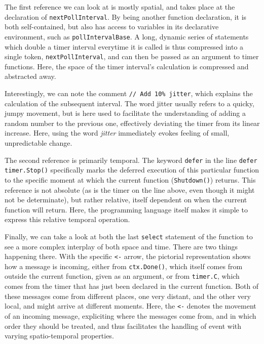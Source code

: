The first reference we can look at is mostly spatial, and takes place at the declaration of \lstinline{nextPollInterval}. By being another function declaration, it is both self-contained, but also has access to variables in its declarative environment, such as \lstinline{pollIntervalBase}. A long, dynamic series of statements which double a timer interval everytime it is called is thus compressed into a single token, \lstinline{nextPollInterval}, and can then be passed as an argument to timer functions. Here, the space of the timer interval's calculation is compressed and abstracted away.

Interestingly, we can note the comment \lstinline{// Add 10% jitter}, which explains the calculation of the subsequent interval. The word jitter usually refers to a quicky, jumpy movement, but is here used to facilitate the understanding of adding a random number to the previous one, effectively deviating the timer from its linear increase. Here, using the word \emph{jitter} immediately evokes feeling of small, unpredictable change.

The second reference is primarily temporal. The keyword \lstinline{defer} in the line \lstinline{defer timer.Stop()} specifically marks the deferred execution of this particular function to the specific moment at which the current function (\lstinline{Shutdown()}) returns. This reference is not absolute (as is the timer on the line above, even though it might not be determinate), but rather relative, itself dependent on when the current function will return. Here, the programming language itself makes it simple to express this relative temporal operation.

Finally, we can take a look at both the last \lstinline{select} statement of the function to see a more complex interplay of both space and time. There are two things happening there. With the specific \lstinline{<-} arrow, the pictorial representation shows how a message is incoming, either from \lstinline{ctx.Done()}, which itself comes from outside the current function, given as an argument, or from \lstinline{timer.C}, which comes from the timer that has just been declared in the current function. Both of these messages come from different places, one very distant, and the other very local, and might arrive at different moments. Here, the \lstinline{<-} denotes the movement of an incoming message, expliciting where the messages come from, and in which order they should be treated, and thus facilitates the handling of event with varying spatio-temporal properties.

